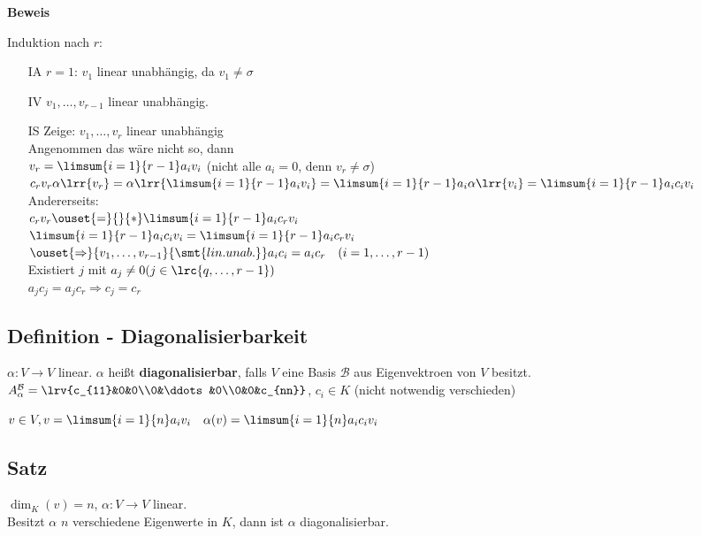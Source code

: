 	\textbf{Beweis}
		
	Induktion nach $r$:
	\begin{itemize}
		\item[IA] $r=1$: $v_1$ linear unabhängig, da $v_1\neq\sigma$
		\item[IV] $v_1,\dots,v_{r-1}$ linear unabhängig.
		\item[IS] Zeige: $v_1,\dots,v_r$ linear unabhängig\\
			Angenommen das wäre nicht so, dann\\
			$v_r=\limsum{i=1}{r-1}a_iv_i$ (nicht alle $a_i=0$, denn $v_r\neq\sigma$)\\
			$c_rv_r\alpha\lrr{v_r}=\alpha\lrr{\limsum{i=1}{r-1}a_iv_i}=\limsum{i=1}{r-1}a_i\alpha\lrr{v_i}=\limsum{i=1}{r-1}a_ic_iv_i$\\
			Andererseits:\\
			$c_rv_r\ouset{=}{}{*}\limsum{i=1}{r-1}a_ic_rv_i$\\
			$\limsum{i=1}{r-1}a_ic_iv_i=\limsum{i=1}{r-1}a_ic_rv_i$\\
			$\ouset{\Rightarrow}{v_1,\dots,v_{r-1}}{\smt{lin. unab.}}a_ic_i=a_ic_r\quad (i=1,\dots,r-1)$\\
			Existiert $j$ mit $a_j\neq 0 (j\in\lrc{q,\dots,r-1})$\\
			$a_jc_j=a_jc_r\Rightarrow c_j=c_r$\lightning
	\end{itemize}

\subsection{Definition - Diagonalisierbarkeit}
	$\alpha:V\rightarrow V$ linear. $\alpha$ heißt \textbf{diagonalisierbar}, falls $V$ eine Basis $\mathcal{B}$ aus Eigenvektroen von $V$ besitzt.\\
	$A_\alpha^\mathcal{B}=\lrv{c_{11}&0&0\\0&\ddots&0\\0&0&c_{nn}}$, $c_i\in K$ (nicht notwendig verschieden)
	
	$v\in V, v=\limsum{i=1}{n}a_iv_i\quad \alpha(v)=\limsum{i=1}{n}a_ic_iv_i$
	
\subsection{Satz}
	$\dim_K(v)=n$, $\alpha:V\rightarrow V$ linear.\\
	Besitzt $\alpha$ $n$ verschiedene Eigenwerte in $K$, dann ist $\alpha$ diagonalisierbar.
	
